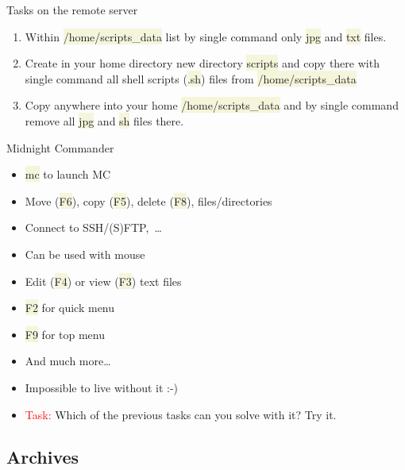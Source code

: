 \documentclass[compress, ucs, xelatex, 11pt, xcolor=svgnames, aspectratio=169,
	hyperref={
		bookmarks=true,
		unicode=true,
		colorlinks=true,
		pdftitle={Linux, command line and MetaCentrum},
		plainpages=false,
		pdfauthor={Vojtech Zeisek},
		pdfsubject={Course about use of Linux command line, writing shell scripts and using MetaCentrum of CESNET},
		pdfcreator={XeLaTeX},
		pdfkeywords={Linux, GNU, BASH, shell, command line, MetaCentrum},
		linkcolor=DarkRed, %
		anchorcolor=DarkBlue, %
		citecolor=Indigo, %
		filecolor=NavyBlue, %
		menucolor=DarkMagenta, %
		urlcolor=DarkBlue, %
		pdftex},
	url={hyphens, lowtilde} %
	]{beamer}
\renewcommand{\texttt}[1]{\colorbox{Beige}{{\ttfamily #1}}}
\renewcommand{\alert}[1]{\textcolor{red}{#1}}
\begin{document}
\begin{frame}[allowframebreaks]{Tasks on the remote server}
\begin{enumerate}
		\item Within \texttt{/home/scripts\_data} list by single command only \texttt{jpg} and \texttt{txt} files.
		\item Create in your home directory new directory \texttt{scripts} and copy there with single command all shell scripts (\texttt{*.sh}) files from \texttt{/home/scripts\_data}
		\item Copy anywhere into your home \texttt{/home/scripts\_data} and by single command remove all \texttt{jpg} and \texttt{sh} files there.
	\end{enumerate}
\end{frame}

\begin{frame}{Midnight Commander}
	\begin{multicols}{2}
		\begin{itemize}
			\item \texttt{mc} to launch MC
			\item Move (\texttt{F6}), copy (\texttt{F5}), delete (\texttt{F8}), files/directories
			\item Connect to SSH/(S)FTP,~\ldots
			\item Can be used with mouse
			\item Edit (\texttt{F4}) or view (\texttt{F3}) text files
			\item \texttt{F2} for quick menu
			\item \texttt{F9} for top menu
			\item And much more\ldots
			\item Impossible to live without it :-)
			\item \alert{Task:} Which of the previous tasks can you solve with it? Try it.
		\end{itemize}
		\texttt{[image: mc.png]}
	\end{multicols}
\end{frame}

\subsection{Archives}
\end{document}
